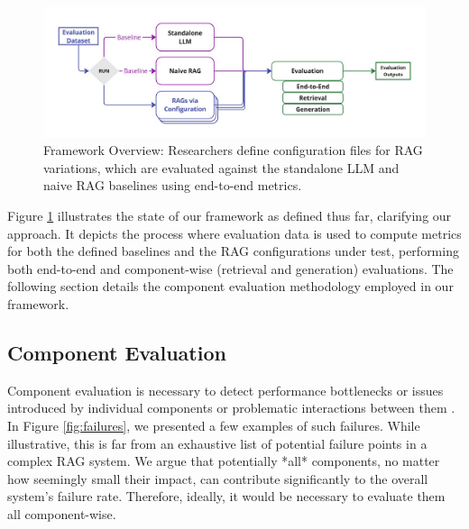 \begin{figure}[h]
  \centering
  \includegraphics[width=\textwidth]{images/FrameworkBaselines.pdf}
  \caption{Framework Overview: Researchers define configuration files for RAG variations, which are evaluated against the standalone LLM and naive RAG baselines using end-to-end metrics.}
  \label{fig:framework-baselines}
\end{figure}

Figure \ref{fig:framework-baselines} illustrates the state of our framework as defined thus far, clarifying our approach. It depicts the process where evaluation data is used to compute metrics for both the defined baselines and the RAG configurations under test, performing both end-to-end and component-wise (retrieval and generation) evaluations. The following section details the component evaluation methodology employed in our framework.

\subsection{Component Evaluation}

Component evaluation is necessary to detect performance bottlenecks or issues introduced by individual components or problematic interactions between them \cite{Salemi.2024}. In Figure \ref{fig:failures}, we presented a few examples of such failures. While illustrative, this is far from an exhaustive list of potential failure points in a complex RAG system. We argue that potentially *all* components, no matter how seemingly small their impact, can contribute significantly to the overall system's failure rate. Therefore, ideally, it would be necessary to evaluate them all component-wise.


